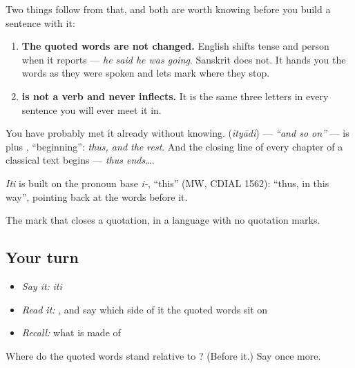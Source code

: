 Two things follow from that, and both are worth knowing before you build a sentence with it:

\begin{enumerate}
\raggedright
  \item \textbf{The quoted words are not changed.} English shifts tense and person when it reports — \emph{he said he was going}. Sanskrit does not. It hands you the words as they were spoken and lets \textbf{} mark where they stop.
  \item \textbf{ is not a verb and never inflects.} It is the same three letters in every sentence you will ever meet it in.
\end{enumerate}

You have probably met it already without knowing. \textbf{} (\emph{ityādi}) — \emph{\textquotedblleft{}and so on\textquotedblright{}} — is \textbf{} plus \textbf{}, \textquotedblleft{}beginning\textquotedblright{}: \emph{thus, and the rest}. And the closing line of every chapter of a classical text begins \textbf{} — \emph{thus ends…}.

\begin{cousinweb}
\emph{Iti} is built on the pronoun base \emph{i-}, \textquotedblleft{}this\textquotedblright{} (MW, CDIAL 1562): \textquotedblleft{}thus, in this way\textquotedblright{}, pointing back at the words before it.
\end{cousinweb}

\begin{grammarlens}[title={What you've built}]
The mark that closes a quotation, in a language with no quotation marks.
\end{grammarlens}

\subsection*{Your turn}
\begin{itemize}
\raggedright
  \item \emph{Say it:} \emph{iti}
  \item \emph{Read it:} \textbf{}, and say which side of it the quoted words sit on
  \item \emph{Recall:} what \textbf{} is made of
\end{itemize}

\begin{tcolorbox}[breakable,colback=teal!4,colframe=teal!35!black,title={Before you move on}]
Where do the quoted words stand relative to \textbf{}? (Before it.) Say \textbf{} once more.
\end{tcolorbox}
